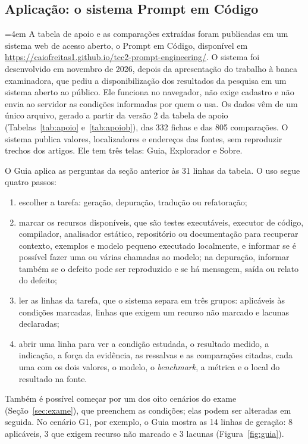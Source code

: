 \subsection{Aplicação: o sistema Prompt em Código}\label{sec:aplicacao}
{\emergencystretch=4em
A tabela de apoio e as comparações extraídas foram publicadas em um sistema web de acesso aberto, o Prompt em
Código, disponível em \url{https://caiofreitas1.github.io/tcc2-prompt-engineering/}. O sistema foi desenvolvido em
novembro de 2026, depois da apresentação do trabalho à banca examinadora, que pediu a disponibilização dos
resultados da pesquisa em um sistema aberto ao público. Ele funciona no navegador, não exige cadastro e não envia
ao servidor as condições informadas por quem o usa. Os dados vêm de um único arquivo, gerado a partir da versão 2
da tabela de apoio (Tabelas~\ref{tab:apoio} e~\ref{tab:apoiob}), das 332 fichas e das 805 comparações. O sistema
publica valores, localizadores e endereços das fontes, sem reproduzir trechos dos artigos. Ele tem três telas:
Guia, Explorador e Sobre.\par}

O Guia aplica as perguntas da seção anterior às 31 linhas da tabela. O uso segue quatro passos:
\begin{enumerate}
  \item escolher a tarefa: geração, depuração, tradução ou refatoração;
  \item marcar os recursos disponíveis, que são testes executáveis, executor de código, compilador, analisador
  estático, repositório ou documentação para recuperar contexto, exemplos e modelo pequeno executado localmente, e
  informar se é possível fazer uma ou várias chamadas ao modelo; na depuração, informar também se o defeito pode
  ser reproduzido e se há mensagem, saída ou relato do defeito;
  \item ler as linhas da tarefa, que o sistema separa em três grupos: aplicáveis às condições marcadas, linhas que
  exigem um recurso não marcado e lacunas declaradas;
  \item abrir uma linha para ver a condição estudada, o resultado medido, a indicação, a força da evidência, as
  ressalvas e as comparações citadas, cada uma com os dois valores, o modelo, o \textit{benchmark}, a métrica e o
  local do resultado na fonte.
\end{enumerate}
Também é possível começar por um dos oito cenários do exame (Seção~\ref{sec:exame}), que preenchem as condições; elas
podem ser alteradas em seguida. No cenário G1, por exemplo, o Guia mostra as 14 linhas de geração: 8 aplicáveis, 3
que exigem recurso não marcado e 3 lacunas (Figura~\ref{fig:guia}).

